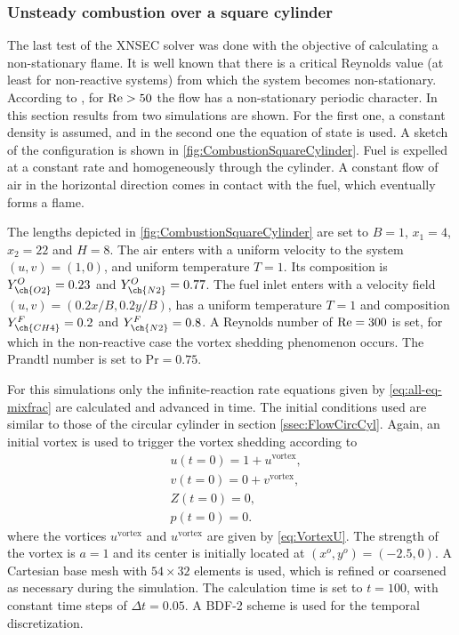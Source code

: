 \subsubsection{Unsteady combustion over a square cylinder}
The last test of the XNSEC solver was done with the objective of calculating a non-stationary flame. It is well known that there is a critical Reynolds value (at least for non-reactive systems) from which the system becomes non-stationary. According to \textcite{sharmaHEATFLUIDFLOW2004}, for $\text{Re} > 50$ the flow has a non-stationary periodic character. In this section results from two simulations are shown. For the first one, a constant density is assumed, and in the second one the equation of state is used. 
A sketch of the configuration is shown in \cref{fig:CombustionSquareCylinder}. Fuel is expelled at a constant rate and homogeneously through the cylinder. A constant flow of air in the horizontal direction comes in contact with the fuel, which eventually forms a flame.

The lengths depicted in \cref{fig:CombustionSquareCylinder} are set to $B = 1$, $x_1 = 4$, $x_2 = 22$ and $H = 8$. The air enters with a uniform velocity to the system $(u,v) =(1,0)$, and uniform temperature $T = 1$. Its composition is $Y^O_{\ch{O2}} = 0.23$ and $Y^O_{\ch{N2}} = 0.77$. The fuel inlet enters with a velocity field $(u,v) = (0.2x/B,0.2y/B)$, has a uniform temperature $T = 1$ and composition $Y^F_{\ch{CH4}} = 0.2$ and $Y^F_{\ch{N2}} = 0.8$. A Reynolds number of $\text{Re} = 300$ is set, for which in the non-reactive case the vortex shedding phenomenon occurs. The Prandtl number is set to $\text{Pr} = 0.75$. 

For this simulations only the infinite-reaction rate equations given by \cref{eq:all-eq-mixfrac} are calculated and advanced in time. The initial conditions used are similar to those of the circular cylinder in section \cref{ssec:FlowCircCyl}. Again, an initial vortex is used to trigger the vortex shedding according to
\begin{subequations} 
	\begin{align}
		&u(t=0) = 1 + u^{\text{vortex}},  \\
		&v(t=0) = 0 + v^{\text{vortex}},  \\
		&Z(t=0) = 0,\\
		&p(t=0) = 0.
	\end{align}
\end{subequations}
where the vortices $u^{\text{vortex}}$ and $u^{\text{vortex}}$ are given by \cref{eq:VortexU}. The strength of the vortex is $a=1$ and its center is initially located at $(x^o,y^o) = (-2.5, 0)$. A Cartesian base mesh with $54\times32$ elements is used, which is refined or coarsened as necessary during the simulation. The calculation time is set to $t = 100$, with constant time steps of $\Delta t = 0.05$.  A BDF-2 scheme is used for the temporal discretization.

